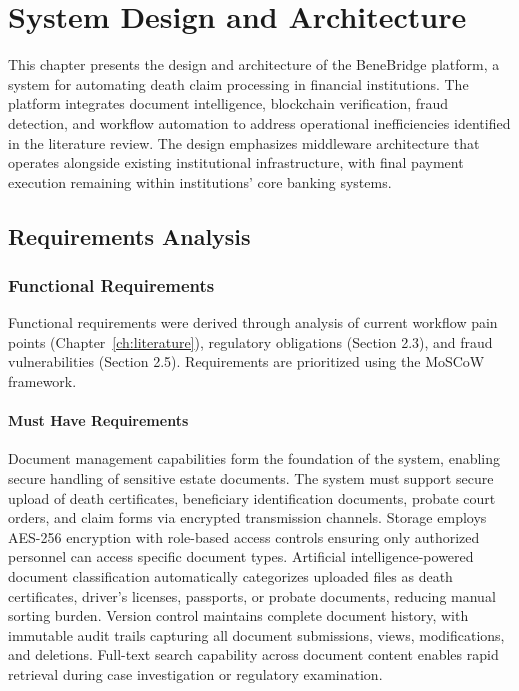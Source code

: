 \chapter{System Design and Architecture}\label{ch:design}

This chapter presents the design and architecture of the BeneBridge platform, a system for automating death claim processing in financial institutions. The platform integrates document intelligence, blockchain verification, fraud detection, and workflow automation to address operational inefficiencies identified in the literature review. The design emphasizes middleware architecture that operates alongside existing institutional infrastructure, with final payment execution remaining within institutions' core banking systems.

\section{Requirements Analysis}\label{sec:requirements}

\subsection{Functional Requirements}

Functional requirements were derived through analysis of current workflow pain points (Chapter~\ref{ch:literature}), regulatory obligations (Section 2.3), and fraud vulnerabilities (Section 2.5). Requirements are prioritized using the MoSCoW framework.

\subsubsection{Must Have Requirements}

Document management capabilities form the foundation of the system, enabling secure handling of sensitive estate documents. The system must support secure upload of death certificates, beneficiary identification documents, probate court orders, and claim forms via encrypted transmission channels. Storage employs AES-256 encryption with role-based access controls ensuring only authorized personnel can access specific document types. Artificial intelligence-powered document classification automatically categorizes uploaded files as death certificates, driver's licenses, passports, or probate documents, reducing manual sorting burden. Version control maintains complete document history, with immutable audit trails capturing all document submissions, views, modifications, and deletions. Full-text search capability across document content enables rapid retrieval during case investigation or regulatory examination.

